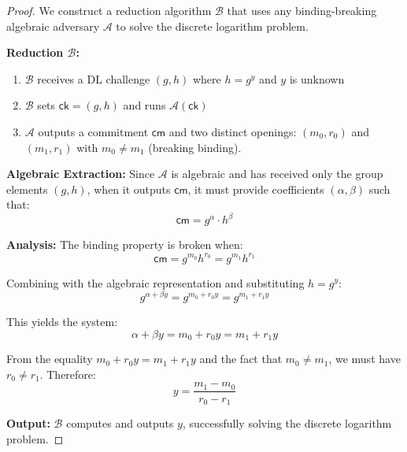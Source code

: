 \begin{proof}
We construct a reduction algorithm $\mathcal{B}$ that uses any binding-breaking algebraic adversary $\mathcal{A}$ to solve the discrete logarithm problem.

\textbf{Reduction $\mathcal{B}$:}
\begin{enumerate}
\item $\mathcal{B}$ receives a DL challenge $(g, h)$ where $h = g^y$ and $y$ is unknown
\item $\mathcal{B}$ sets $\mathsf{ck} = (g, h)$ and runs $\mathcal{A}(\mathsf{ck})$
\item $\mathcal{A}$ outputs a commitment $\mathsf{cm}$ and two distinct openings: $(m_0, r_0)$ and $(m_1, r_1)$ with $m_0 \neq m_1$ (breaking binding).
\end{enumerate}

\textbf{Algebraic Extraction:} Since $\mathcal{A}$ is algebraic and has received only the group elements $(g, h)$, when it outputs $\mathsf{cm}$, it must provide coefficients $(\alpha, \beta)$ such that:
$$\mathsf{cm} = g^\alpha \cdot h^\beta$$

\textbf{Analysis:} The binding property is broken when:
$$\mathsf{cm} = g^{m_0} h^{r_0} = g^{m_1} h^{r_1}$$

Combining with the algebraic representation and substituting $h = g^y$:
$$g^{\alpha + \beta y} = g^{m_0 + r_0 y} = g^{m_1 + r_1 y}$$

This yields the system:
$$\alpha + \beta y = m_0 + r_0 y = m_1 + r_1 y$$

From the equality $m_0 + r_0 y = m_1 + r_1 y$ and the fact that $m_0 \neq m_1$, we must have $r_0 \neq r_1$. Therefore:
$$y = \frac{m_1 - m_0}{r_0 - r_1}$$

\textbf{Output:} $\mathcal{B}$ computes and outputs $y$, successfully solving the discrete logarithm problem.
\end{proof}

